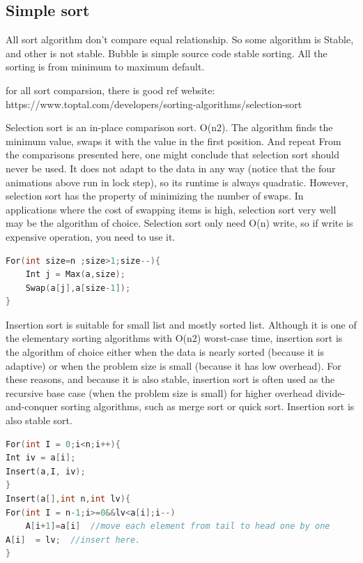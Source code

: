 \documentclass[a4paper,11pt,twoside]{book}
\begin{document}
\subsection{Simple sort}

	
	\par All sort algorithm don't compare equal relationship. So some algorithm is Stable, and other is not stable. Bubble is simple source code stable sorting. All the sorting is from minimum to maximum default.

 

	\par for all sort comparsion, there is good ref website: \newline  https://www.toptal.com/developers/sorting-algorithms/selection-sort

	\par Selection sort is an in-place comparison sort. O(n2). The algorithm finds the minimum value, swaps it with the value in the first position.  And repeat From the comparisons presented here, one might conclude that selection sort should never be used. It does not adapt to the data in any way (notice that the four animations above run in lock step), so its runtime is always quadratic. However, selection sort has the property of minimizing the number of swaps. In applications where the cost of swapping items is high, selection sort very well may be the algorithm of choice. Selection sort only need O(n) write, so if write is expensive operation, you need to use it. 
\begin{lstlisting}[frame=single, language=c++]
For(int size=n ;size>1;size--){
	Int j = Max(a,size);
	Swap(a[j],a[size-1]);
}
\end{lstlisting}

	\par Insertion sort is suitable for small list and mostly sorted list. Although it is one of the elementary sorting algorithms with O(n2) worst-case time, insertion sort is the algorithm of choice either when the data is nearly sorted (because it is adaptive) or when the problem size is small (because it has low overhead). For these reasons, and because it is also stable, insertion sort is often used as the recursive base case (when the problem size is small) for higher overhead divide-and-conquer sorting algorithms, such as merge sort or quick sort. Insertion sort is also stable sort. 

\begin{lstlisting}[frame=single, language=c++]
For(int I = 0;i<n;i++){
Int iv = a[i];
Insert(a,I, iv);
}
Insert(a[],int n,int lv){
For(int I = n-1;i>=0&&lv<a[i];i--)
    A[i+1]=a[i]  //move each element from tail to head one by one
A[i]  = lv;  //insert here. 
}
\end{lstlisting}
\end{document}
